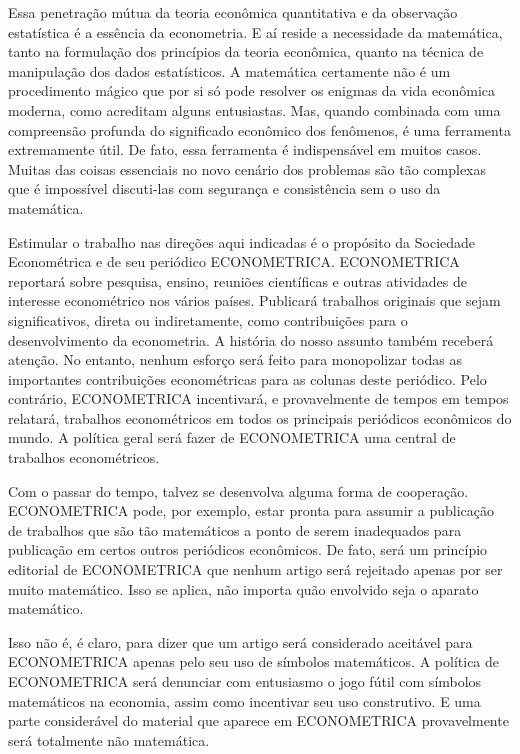 \documentclass[12pt]{article}
\begin{document}
Essa penetração mútua da teoria econômica quantitativa e da observação estatística é a essência da econometria. E aí reside a necessidade da matemática, tanto na formulação dos princípios da teoria econômica, quanto na técnica de manipulação dos dados estatísticos. A matemática certamente não é um procedimento mágico que por si só pode resolver os enigmas da vida econômica moderna, como acreditam alguns entusiastas. Mas, quando combinada com uma compreensão profunda do significado econômico dos fenômenos, é uma ferramenta extremamente útil. De fato, essa ferramenta é indispensável em muitos casos. Muitas das coisas essenciais no novo cenário dos problemas são tão complexas que é impossível discuti-las com segurança e consistência sem o uso da matemática.

Estimular o trabalho nas direções aqui indicadas é o propósito da Sociedade Econométrica e de seu periódico ECONOMETRICA. ECONOMETRICA reportará sobre pesquisa, ensino, reuniões científicas e outras atividades de interesse econométrico nos vários países. Publicará trabalhos originais que sejam significativos, direta ou indiretamente, como contribuições para o desenvolvimento da econometria. A história do nosso assunto também receberá atenção. No entanto, nenhum esforço será feito para monopolizar todas as importantes contribuições econométricas para as colunas deste periódico. Pelo contrário, ECONOMETRICA incentivará, e provavelmente de tempos em tempos relatará, trabalhos econométricos em todos os principais periódicos econômicos do mundo. A política geral será fazer de ECONOMETRICA uma central de trabalhos econométricos.

Com o passar do tempo, talvez se desenvolva alguma forma de cooperação. ECONOMETRICA pode, por exemplo, estar pronta para assumir a publicação de trabalhos que são tão matemáticos a ponto de serem inadequados para publicação em certos outros periódicos econômicos. De fato, será um princípio editorial de ECONOMETRICA que nenhum artigo será rejeitado apenas por ser muito matemático. Isso se aplica, não importa quão envolvido seja o aparato matemático.

Isso não é, é claro, para dizer que um artigo será considerado aceitável para ECONOMETRICA apenas pelo seu uso de símbolos matemáticos. A política de ECONOMETRICA será denunciar com entusiasmo o jogo fútil com símbolos matemáticos na economia, assim como incentivar seu uso construtivo. E uma parte considerável do material que aparece em ECONOMETRICA provavelmente será totalmente não matemática.
\end{document}
